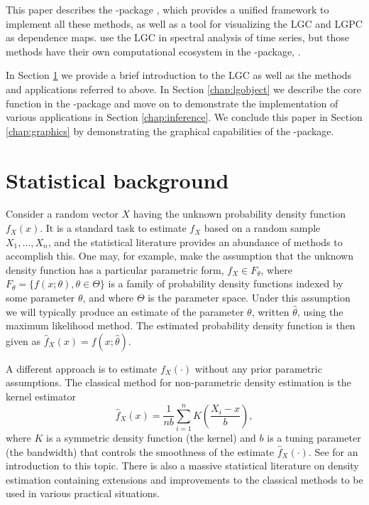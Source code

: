 This paper describes the -package \citep{otne:2019}, which provides a unified framework to implement all these methods, as well as a tool for visualizing the LGC and LGPC as dependence maps. \citet{jord:tjos:2017} use the LGC in spectral analysis of time series, but those methods have their own computational ecosystem in the -package, \citet{jord:2018}.

In Section \ref{chap:background} we provide a brief introduction to the LGC as well as the methods and applications referred to above. In Section \ref{chap:lgobject} we describe the core function in the -package and move on to demonstrate the implementation of various applications in Section \ref{chap:inference}. We conclude this paper in Section \ref{chap:graphics} by demonstrating the graphical capabilities of the -package.

\section{Statistical background} 
\label{chap:background}

Consider a random vector $X$ having the unknown probability density function $f_X(x)$. It is a standard task to estimate $f_X$ based on a random sample $X_1,\ldots, X_n$, and the statistical literature provides an abundance of methods to accomplish this. One may, for example, make the assumption that the unknown density function has a particular parametric form, $f_X \in F_{\theta}$, where $F_{\theta} = \{f(x;\theta), \theta \in \Theta\}$ is a family of probability density functions indexed by some parameter $\theta$, and where $\Theta$ is the parameter space. Under this assumption we will typically produce an estimate of the parameter $\theta$, written $\widehat \theta$, using the maximum likelihood method. The estimated probability density function is then given as $\widehat f_X(x) = f(x; \widehat\theta)$.

A different approach is to estimate $f_X(\cdot)$ without any prior parametric assumptions. The classical method for non-parametric density estimation is the kernel estimator 
$$\widehat f_X(x) = \frac{1}{nb}\sum_{i=1}^n K\left(\frac{X_i - x}{b}\right),$$
where $K$ is a symmetric density function (the kernel) and $b$ is a tuning parameter (the bandwidth) that controls the smoothness of the estimate $\widehat f_X(\cdot)$. See \citet{silv:1986} for an introduction to this topic. There is also a massive statistical literature on density estimation containing extensions and improvements to the classical methods to be used in various practical situations. 

